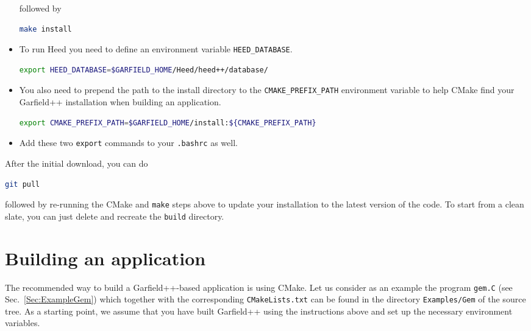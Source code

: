 \begin{itemize}
    followed by
\begin{lstlisting}[language=bash]
make install
\end{lstlisting}
    \item
    To run Heed you need to define an environment variable 
    \texttt{HEED\_DATABASE}.
\begin{lstlisting}[language=bash]
export HEED_DATABASE=$GARFIELD_HOME/Heed/heed++/database/
\end{lstlisting}
    \item
    You also need to prepend the path to the install directory to the 
    \texttt{CMAKE\_PREFIX\_PATH} environment variable to help 
    CMake find your Garfield++ installation when building an application.
\begin{lstlisting}[language=bash]
export CMAKE_PREFIX_PATH=$GARFIELD_HOME/install:${CMAKE_PREFIX_PATH}
\end{lstlisting}
    \item
    Add these two \texttt{export} commands to your \texttt{.bashrc} as well.
  \end{itemize}

After the initial download, you can do 
\begin{lstlisting}[language=bash]
git pull
\end{lstlisting}
followed by re-running the CMake and \texttt{make} steps above
to update your installation to the latest version of the code. 
To start from a clean slate, you can just delete and recreate the 
\texttt{build} directory. 

\section{Building an application}
The recommended way to build a Garfield++-based application is 
using CMake. Let us consider as an example the program \texttt{gem.C} 
(see Sec.~\ref{Sec:ExampleGem}) 
which together with the corresponding \texttt{CMakeLists.txt} can be 
found in the directory \texttt{Examples/Gem} of the source tree. 
As a starting point, we assume that you have built Garfield++ using the 
instructions above and set up the necessary environment variables. 

